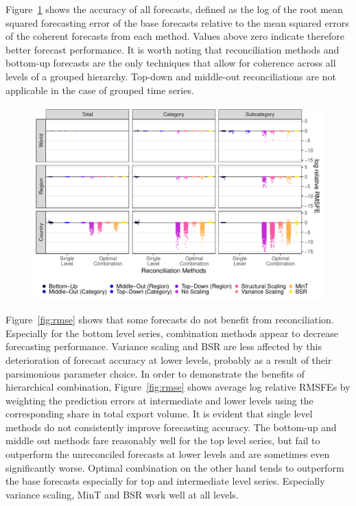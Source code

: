 \documentclass[a4paper,fleqn,11pt]{article}
\begin{document}
Figure~\ref{fig:rmse_all} shows the accuracy of all forecasts, defined as the log of the root mean squared forecasting error of the base forecasts relative to the mean squared errors of the coherent forecasts from each method. Values above zero indicate therefore better forecast performance. It is worth noting that reconciliation methods and bottom-up forecasts are the only techniques that allow for coherence across all levels of a grouped hierarchy. Top-down and middle-out reconciliations are not applicable in the case of grouped time series.

\begin{figure}[H]
	\includegraphics[width=\textwidth]{fig/fig_rmsfe_dots}
	\label{fig:rmse_all}
\end{figure}

Figure~\ref{fig:rmse} shows that some forecasts do not benefit from reconciliation. Especially for the bottom level series, combination methods appear to decrease forecasting performance. Variance scaling and BSR are less affected by this deterioration of forecast accuracy at lower levels, probably as a result of their parsimonious parameter choice. In order to demonstrate the benefits of hierarchical combination, Figure~\ref{fig:rmse} shows average log relative RMSFEs by weighting the prediction errors at intermediate and lower levels using the corresponding share in total export volume. It is evident that single level methods do not consistently improve forecasting accuracy. The bottom-up and middle out methods fare reasonably well for the top level series, but fail to outperform the unreconciled forecasts at lower levels and are sometimes even significantly worse. Optimal combination on the other hand tends to outperform the base forecasts especially for top and intermediate level series. Especially variance scaling, MinT and BSR work well at all levels.
\end{document}
